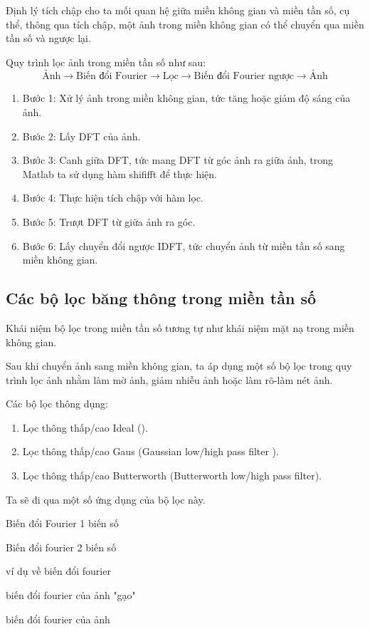 \documentclass[12pt,a4paper]{report}
\numberwithin{equation}{section}
\theoremstyle{definition} %
\begin{document}
Định lý tích chập cho ta mối quan hệ giữa miền không gian và miền tần số, cụ thể, thông qua tích chập, một ảnh trong miền không gian có thể chuyển qua miền tần số và ngược lại.

Quy trình lọc ảnh trong miền tần số như sau:
\[\text{Ảnh}\rightarrow\text{Biến đổi Fourier}\rightarrow\text{Lọc}\rightarrow\text{Biến đổi Fourier ngược}
\rightarrow\text{Ảnh}\]
\begin{enumerate}
\item Bước 1: Xử lý ảnh trong miền không gian, tức tăng hoặc giảm độ sáng của ảnh.
\item Bước 2: Lấy DFT của ảnh.
\item Bước 3: Canh giữa DFT, tức mang DFT từ góc ảnh ra giữa ảnh, trong Matlab ta sử dụng hàm shififft để thực hiện.
\item Bước 4: Thực hiện tích chập với hàm lọc.
\item Bước 5: Trượt DFT từ giữa ảnh ra góc.
\item Bước 6: Lấy chuyển đổi ngược IDFT, tức chuyển ảnh từ miền tần số sang miền không gian.
\end{enumerate}
\subsection{Các bộ lọc băng thông trong miền tần số}

Khái niệm bộ lọc trong miền tần số tương tự như khái niệm mặt nạ trong miền không gian.

Sau khi chuyển ảnh sang miền không gian, ta áp dụng một số bộ lọc trong quy trình lọc ảnh nhằm làm mờ ảnh, giảm nhiễu ảnh hoặc làm rõ-làm nét ảnh.

Các bộ lọc thông dụng:
\begin{enumerate}
\item Lọc thông thấp/cao Ideal ().
\item Lọc thông thấp/cao Gaus (Gaussian low/high pass filter
).
\item Lọc thông thấp/cao Butterworth (Butterworth low/high pass filter).
\end{enumerate}

Ta sẽ đi qua một số ứng dụng của bộ lọc này.

Biến đổi Fourier 1 biến số

Biến đổi fourier 2 biến số

ví dụ về biến đổi fourier

biến đổi fourier của ảnh "gạo"

biến đổi fourier của ảnh
\end{document}
